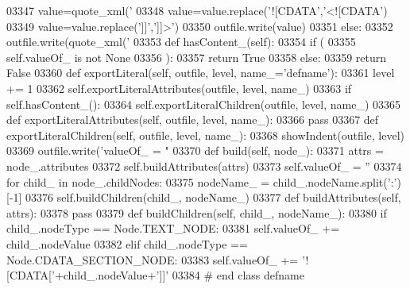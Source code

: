 \begin{DoxyCode}
{{{{{{{{{{{{{{{{{{{{{{{{{{{{{{{{{{{{{{{{{{{{{{{{{{{{{{{{{{{{{{{{{{{{{{{{{{{{{{{{{{{{{{{{{{{{{{{{{{{{{{{{{{{{{{{{{{{{{{{{{{{{{{{{{{{{{{{{{{{{{{{{{{{{{{{{{{{{{{{{{{{{{{{{{{{{{{{{{{{{{{{{{{{{{{{{{{{{{{{{{{{{{{{{{{{{{{{{{{{{03347             value=quote_xml(\textcolor{stringliteral}{'%
03348             value=value.replace(\textcolor{stringliteral}{'![CDATA'},\textcolor{stringliteral}{'<![CDATA'})
03349             value=value.replace(\textcolor{stringliteral}{']]'},\textcolor{stringliteral}{']]>'})
03350             outfile.write(value)
03351         \textcolor{keywordflow}{else}:
03352             outfile.write(quote_xml(\textcolor{stringliteral}{'%
03353     \textcolor{keyword}{def }hasContent_(self):
03354         \textcolor{keywordflow}{if} (
03355             self.valueOf_ \textcolor{keywordflow}{is} \textcolor{keywordflow}{not} \textcolor{keywordtype}{None}
03356             ):
03357             \textcolor{keywordflow}{return} \textcolor{keyword}{True}
03358         \textcolor{keywordflow}{else}:
03359             \textcolor{keywordflow}{return} \textcolor{keyword}{False}
03360     \textcolor{keyword}{def }exportLiteral(self, outfile, level, name\_='defname'):
03361         level += 1
03362         self.exportLiteralAttributes(outfile, level, name\_)
03363         \textcolor{keywordflow}{if} self.hasContent_():
03364             self.exportLiteralChildren(outfile, level, name\_)
03365     \textcolor{keyword}{def }exportLiteralAttributes(self, outfile, level, name\_):
03366         \textcolor{keywordflow}{pass}
03367     \textcolor{keyword}{def }exportLiteralChildren(self, outfile, level, name\_):
03368         showIndent(outfile, level)
03369         outfile.write(\textcolor{stringliteral}{'valueOf\_ = "%
03370     \textcolor{keyword}{def }build(self, node\_):
03371         attrs = node\_.attributes
03372         self.buildAttributes(attrs)
03373         self.valueOf_ = \textcolor{stringliteral}{''}
03374         \textcolor{keywordflow}{for} child\_ \textcolor{keywordflow}{in} node\_.childNodes:
03375             nodeName\_ = child\_.nodeName.split(\textcolor{stringliteral}{':'})[-1]
03376             self.buildChildren(child\_, nodeName\_)
03377     \textcolor{keyword}{def }buildAttributes(self, attrs):
03378         \textcolor{keywordflow}{pass}
03379     \textcolor{keyword}{def }buildChildren(self, child\_, nodeName\_):
03380         \textcolor{keywordflow}{if} child\_.nodeType == Node.TEXT\_NODE:
03381             self.valueOf\_ += child\_.nodeValue
03382         \textcolor{keywordflow}{elif} child\_.nodeType == Node.CDATA\_SECTION\_NODE:
03383             self.valueOf\_ += \textcolor{stringliteral}{'![CDATA['}+child\_.nodeValue+\textcolor{stringliteral}{']]'}
03384 \textcolor{comment}{# end class defname}
}}}}}}}}}}}}}}}}}}}}}}}}}}}}}}}}}}}}}}}}}}}}}}}}}}}}}}}}}}}}}}}}}}}}}}}}}}}}}}}}}}}}}}}}}}}}}}}}}}}}}}}}}}}}}}}}}}}}}}}}}}}}}}}}}}}}}}}}}}}}}}}}}}}}}}}}}}}}}}}}}}}}}}}}}}}}}}}}}}}}}}}}}}}}}}}}}}}}}}}}}}}}}}}}}}}}}}}}}}}}}}}
\end{DoxyCode}
